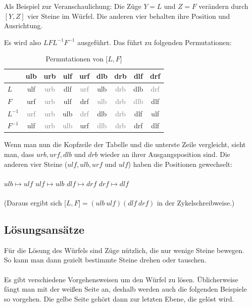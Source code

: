 \documentclass[12pt,a4paper, usenames, dvipsnames]{article}
\begin{document}
Als Beispiel zur Veranschaulichung: Die Züge $Y=L$ und $Z=F$ verändern durch $[Y, Z]$ vier Steine im Würfel. Die anderen vier behalten ihre Position und Ausrichtung. 


Es wird also $LFL^{-1}F^{-1}$ ausgeführt. Das führt zu folgenden Permutationen:

\begin{table}[H]
\centering
\begin{tabular}{|l|c|c|c|c|c|c|c|c|}
\hline
 & ulb & urb & ulf & urf & dlb & drb & dlf & drf \\
\hline
\hline
$L$ & ulf & \textcolor{gray}{urb} & dlf & \textcolor{gray}{urf} & ulb & \textcolor{gray}{drb} & dlb & \textcolor{gray}{drf} \\
\hline
$F$ & urf & \textcolor{gray}{urb} & ulf &  drf & \textcolor{gray}{ulb} & \textcolor{gray}{drb} & \textcolor{gray}{dlb} & dlf \\
\hline
$L^{-1}$ & \textcolor{gray}{urf} & \textcolor{gray}{urb} & ulb & \textcolor{gray}{drf} & dlb & \textcolor{gray}{drb} & dlf & ulf \\
\hline
$F^{-1}$ & ulf & \textcolor{gray}{urb} & \textcolor{gray}{ulb} & urf & \textcolor{gray}{dlb} & \textcolor{gray}{drb} & drf & dlf\\
\hline
\end{tabular}
\caption[Permutationen von $\lbrack L, F \rbrack $]{Permutationen von $\lbrack L, F \rbrack $ }
\end{table}

Wenn man nun die Kopfzeile der Tabelle und die unterste Zeile vergleicht, sieht man, dass $urb, urf, dlb$ und $drb$ wieder an ihrer Ausgangsposition sind. Die anderen vier Steine ($ulf, ulb, urf$ und $ulf$) haben die Positionen gewechselt: \\
\\
$ulb \mapsto ulf$ \hspace*{2.5cm }$ulf  \mapsto ulb$ \hspace*{2.5cm } $dlf \mapsto drf$ \hspace*{2.5cm } $drf \mapsto dlf$
\\
\\
(Daraus ergibt sich $\lbrack L, F \rbrack  = (ulb \ ulf)(dlf \ drf)$ in der Zykelschreibweise.)

%
%
%
%
%
%
%
%
%
%
%
%
%
%
%
%
%
%
%
%
\subsection*{Lösungsansätze}
Für die Lösung des Würfels sind Züge nützlich, die nur wenige Steine bewegen. So kann man dann gezielt bestimmte Steine drehen oder tauschen. 
\\
\\
Es gibt verschiedene Vorgehensweisen um den Würfel zu lösen. Üblicherweise fängt man mit der weißen Seite an, deshalb werden auch die folgenden Beispiele so vorgehen. Die gelbe Seite gehört dann zur letzten Ebene, die gelöst wird. 
\end{document}

